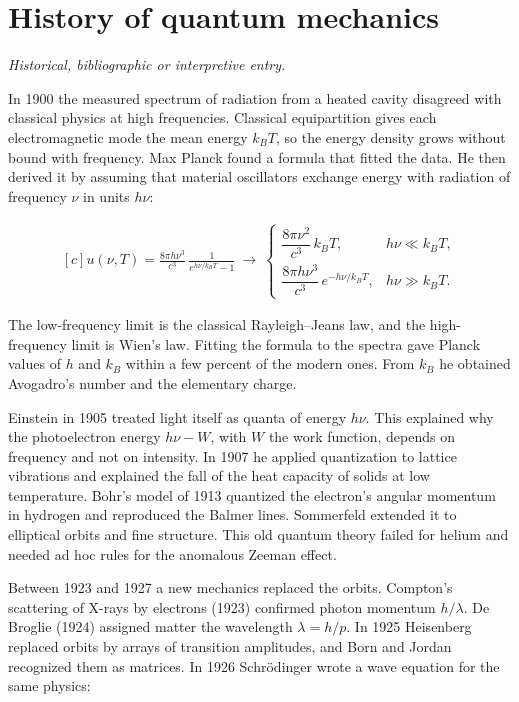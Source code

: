 \documentclass[11pt,oneside]{book}
\newenvironment{centeredalign}{\[\begin{gathered}[c]}{\end{gathered}\]}
\begin{document}
\clearpage

\section{History of quantum mechanics}

\label{topic:history-of-quantum-mechanics}

\par\smallskip\noindent\textit{Historical, bibliographic or interpretive entry.}

In 1900 the measured spectrum of radiation from a heated cavity disagreed with classical physics at high frequencies. Classical equipartition gives each electromagnetic mode the mean energy \(k_BT\), so the energy density grows without bound with frequency. Max Planck found a formula that fitted the data. He then derived it by assuming that material oscillators exchange energy with radiation of frequency \(\nu\) in units \(h\nu\):

\begin{centeredalign}
u(\nu,T)=\frac{8\pi h\nu^3}{c^3}\,\frac{1}{e^{h\nu/k_BT}-1}\ \longrightarrow\
\begin{cases}\dfrac{8\pi\nu^2}{c^3}\,k_BT, & h\nu\ll k_BT,\\[6pt]
\dfrac{8\pi h\nu^3}{c^3}\,e^{-h\nu/k_BT}, & h\nu\gg k_BT.\end{cases}
\end{centeredalign}

The low-frequency limit is the classical Rayleigh--Jeans law, and the high-frequency limit is Wien's law. Fitting the formula to the spectra gave Planck values of \(h\) and \(k_B\) within a few percent of the modern ones. From \(k_B\) he obtained Avogadro's number and the elementary charge.

Einstein in 1905 treated light itself as quanta of energy \(h\nu\). This explained why the photoelectron energy \(h\nu-W\), with \(W\) the work function, depends on frequency and not on intensity. In 1907 he applied quantization to lattice vibrations and explained the fall of the heat capacity of solids at low temperature. Bohr's model of 1913 quantized the electron's angular momentum in hydrogen and reproduced the Balmer lines. Sommerfeld extended it to elliptical orbits and fine structure. This old quantum theory failed for helium and needed ad hoc rules for the anomalous Zeeman effect.

Between 1923 and 1927 a new mechanics replaced the orbits. Compton's scattering of X-rays by electrons (1923) confirmed photon momentum \(h/\lambda\). De Broglie (1924) assigned matter the wavelength \(\lambda=h/p\). In 1925 Heisenberg replaced orbits by arrays of transition amplitudes, and Born and Jordan recognized them as matrices. In 1926 Schrödinger wrote a wave equation for the same physics:
\end{document}

